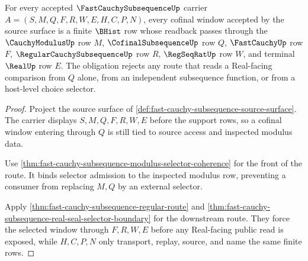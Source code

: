 \begin{theorem}
\label{thm:fast-cauchy-subsequence-cofinal-window-obligation}
For every accepted $\FastCauchySubsequenceUp$ carrier $A=(S,M,Q,F,R,W,E,H,C,P,N)$, every cofinal window accepted by the source surface is a finite $\BHist$ row whose readback passes through the $\CauchyModulusUp$ row $M$, $\CofinalSubsequenceUp$ row $Q$, $\FastCauchyUp$ row $F$, $\RegularCauchySubsequenceUp$ row $R$, $\RegSeqRatUp$ row $W$, and terminal $\RealUp$ row $E$. The obligation rejects any route that reads a Real-facing comparison from $Q$ alone, from an independent subsequence function, or from a host-level choice selector.
\end{theorem}
\begin{proof}
Project the source surface of \autoref{def:fast-cauchy-subsequence-source-surface}. The carrier displays $S,M,Q,F,R,W,E$ before the support rows, so a cofinal window entering through $Q$ is still tied to source access and inspected modulus data.

Use \autoref{thm:fast-cauchy-subsequence-modulus-selector-coherence} for the front of the route. It binds selector admission to the inspected modulus row, preventing a consumer from replacing $M,Q$ by an external selector.

Apply \autoref{thm:fast-cauchy-subsequence-regular-route} and \autoref{thm:fast-cauchy-subsequence-real-seal-selector-boundary} for the downstream route. They force the selected window through $F,R,W,E$ before any Real-facing public read is exposed, while $H,C,P,N$ only transport, replay, source, and name the same finite rows.
\end{proof}

